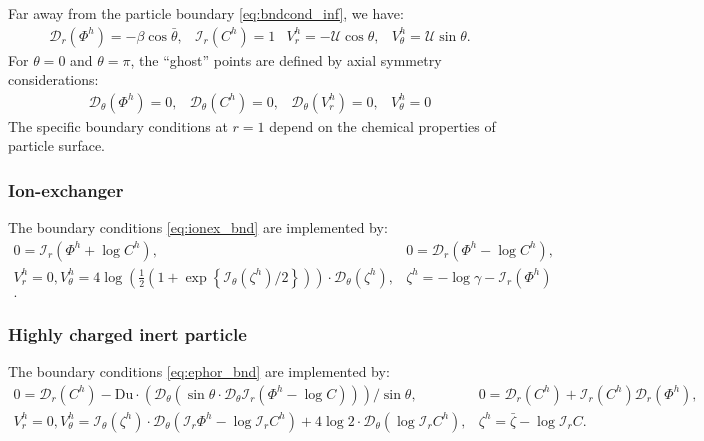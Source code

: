 \documentclass[preprint,10pt]{elsarticle}
\newcommand{\pars}[1]{\left(#1\right)}
\newcommand\Du{\text{Du}}
\newcommand\cI{\mathcal{I}}
\newcommand\cD{\mathcal{D}}
\newcommand\cU{\mathscr{U}}
\begin{document}
Far away from the particle boundary \eqref{eq:bndcond_inf}, we have:
\begin{equation}
\begin{array}{cccc}
\cD_r \pars{\varPhi^h} = -\beta \cos\bar{\theta}, &
\cI_r \pars{C^h} = 1 &
V_r^h = -\cU \cos\theta, &
V_\theta^h = \cU \sin\theta.
\end{array}\end{equation}
For $\theta = 0$ and $\theta = \pi$, the ``ghost'' points are defined by axial 
symmetry considerations:
\begin{equation} 
\begin{array}{cccc}
\cD_\theta \pars{\varPhi^h} = 0, &
\cD_\theta \pars{C^h} = 0, &
\cD_\theta \pars{V_r^h} = 0, &
V_\theta^h = 0
\end{array}
\end{equation}
The specific boundary conditions at $r=1$
depend on the chemical properties of particle surface.

\subsubsection{Ion-exchanger} The boundary conditions \eqref{eq:ionex_bnd} 
are implemented by:
\begin{equation}
\begin{array}{lll}
0 = \cI_r(\varPhi^h + \log C^h), & 0 = \cD_r(\varPhi^h - \log C^h), \\
V^h_r = 0, V^h_\theta = 4\log\pars{\frac{1}{2}\pars{1 + \exp\left\{\cI_\theta(\zeta^h)/2\right\}}} \cdot \cD_\theta(\zeta^h), &
\zeta^h = - \log \gamma - \cI_r(\varPhi^h)\\.
\end{array}
\end{equation}

\subsubsection{Highly charged inert particle} The boundary conditions \eqref{eq:ephor_bnd} 
are implemented by:
\begin{equation}
\begin{array}{lll}
0 = \cD_r(C^h) - \Du \cdot 
\pars{\cD_\theta \pars{\sin\theta \cdot \cD_\theta \cI_r\pars{\varPhi^h - \log C}}}/{\sin\theta}, &
0 = \cD_r(C^h) + \cI_r(C^h) \cD_r(\varPhi^h), \\
V^h_r = 0, 
V^h_\theta = \cI_\theta(\zeta^h) \cdot \cD_\theta(\cI_r \varPhi^h - \log \cI_r C^h) + 
4 \log 2 \cdot \cD_\theta(\log \cI_r C^h), 
& \zeta^h = \bar{\zeta} - \log \cI_r C.
\end{array}
\end{equation}
\end{document}
